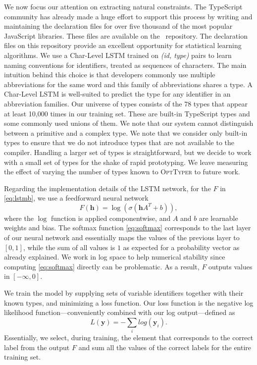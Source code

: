 \documentclass[acmsmall, review, anonymous]{acmart}\settopmatter{printfolios=true,printccs=false,printacmref=false}
\newcommand{\projectname}{\textsc{OptTyper}\xspace}
\begin{document}
We now focus our attention on extracting natural constraints.
The TypeScript community has already
made a huge effort to support this process by writing and maintaining the
declaration files for over five thousand of the most popular JavaScript
libraries. These files are available on the~\citet{definitelytyped}
repository. The declaration files on this repository provide an excellent
opportunity for statistical learning algorithms.
We use a Char-Level LSTM trained on
\textit{(id, type)} pairs to learn naming conventions
for identifiers, treated as sequences of characters.
The main intuition behind this choice is that
developers commonly use multiple abbreviations for the same word and
this family of abbreviations shares a type.
A Char-Level LSTM is well-suited to predict the type for any identifier in
an abbreviation families.
%
Our universe of types consists of the 78 types that appear at least 10,000 times in our training set. These are built-in TypeScript types and some commonly used unions of them. We note that our system cannot distinguish between a primitive and a complex type. We note that we consider only built-in types
to ensure that we do not introduce types that are not available to the compiler. 
%
Handling a larger set of types
is straightforward, but we decide to work with a small set of types for the
shake of rapid prototyping.
%
We leave measuring the effect
of varying the number of types known to \projectname to future work.
%

Regarding the implementation details of the LSTM network, for the $F$ in \eqref{eq:lstmb},
we use a feedforward neural network
\begin{equation}
	F(\bm{h}) = \log\left( \sigma\left(\bm{h}A^T + b \right) \right),\label{eq:feedforward}
\end{equation}
where the $\log$ function is applied componentwise,
and $A$ and $b$ are learnable weights and bias.
The softmax function \eqref{eq:softmax} corresponds to the last layer of our neural network
and essentially maps the values of the previous layer to $[0, 1]$,
while the sum of all values is $1$ as expected for a probability vector as already explained.
We work in log space to help numerical stability since computing \eqref{eq:softmax} directly can be problematic.
As a result, $F$ outputs values in $[-\infty, 0]$.

We train the model by supplying sets of variable identifiers together with their known types,
and minimizing a loss function.
Our loss function is the negative log likelihood function---conveniently combined with our log output---defined as
\begin{equation}
	L(\bm{y}) = -\sum_i log(\bm{y}_i).
\end{equation}
Essentially, we select, during training, the element that corresponds
to the correct label from the output $F$
and sum all the values of the correct labels for the entire training set.
\end{document}
